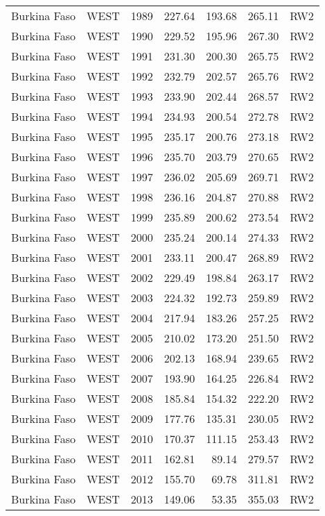 \begin{longtable}{lllrrrl}
  Burkina Faso & WEST & 1989 & 227.64 & 193.68 & 265.11 & RW2 \\ 
  Burkina Faso & WEST & 1990 & 229.52 & 195.96 & 267.30 & RW2 \\ 
  Burkina Faso & WEST & 1991 & 231.30 & 200.30 & 265.75 & RW2 \\ 
  Burkina Faso & WEST & 1992 & 232.79 & 202.57 & 265.76 & RW2 \\ 
  Burkina Faso & WEST & 1993 & 233.90 & 202.44 & 268.57 & RW2 \\ 
  Burkina Faso & WEST & 1994 & 234.93 & 200.54 & 272.78 & RW2 \\ 
  Burkina Faso & WEST & 1995 & 235.17 & 200.76 & 273.18 & RW2 \\ 
  Burkina Faso & WEST & 1996 & 235.70 & 203.79 & 270.65 & RW2 \\ 
  Burkina Faso & WEST & 1997 & 236.02 & 205.69 & 269.71 & RW2 \\ 
  Burkina Faso & WEST & 1998 & 236.16 & 204.87 & 270.88 & RW2 \\ 
  Burkina Faso & WEST & 1999 & 235.89 & 200.62 & 273.54 & RW2 \\ 
  Burkina Faso & WEST & 2000 & 235.24 & 200.14 & 274.33 & RW2 \\ 
  Burkina Faso & WEST & 2001 & 233.11 & 200.47 & 268.89 & RW2 \\ 
  Burkina Faso & WEST & 2002 & 229.49 & 198.84 & 263.17 & RW2 \\ 
  Burkina Faso & WEST & 2003 & 224.32 & 192.73 & 259.89 & RW2 \\ 
  Burkina Faso & WEST & 2004 & 217.94 & 183.26 & 257.25 & RW2 \\ 
  Burkina Faso & WEST & 2005 & 210.02 & 173.20 & 251.50 & RW2 \\ 
  Burkina Faso & WEST & 2006 & 202.13 & 168.94 & 239.65 & RW2 \\ 
  Burkina Faso & WEST & 2007 & 193.90 & 164.25 & 226.84 & RW2 \\ 
  Burkina Faso & WEST & 2008 & 185.84 & 154.32 & 222.20 & RW2 \\ 
  Burkina Faso & WEST & 2009 & 177.76 & 135.31 & 230.05 & RW2 \\ 
  Burkina Faso & WEST & 2010 & 170.37 & 111.15 & 253.43 & RW2 \\ 
  Burkina Faso & WEST & 2011 & 162.81 & 89.14 & 279.57 & RW2 \\ 
  Burkina Faso & WEST & 2012 & 155.70 & 69.78 & 311.81 & RW2 \\ 
  Burkina Faso & WEST & 2013 & 149.06 & 53.35 & 355.03 & RW2 \\ 

\end{longtable}
